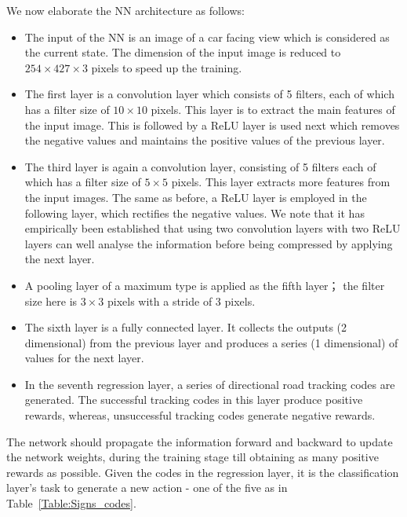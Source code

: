\documentclass{svproc}
\begin{document}
We now elaborate the NN architecture as follows:
\begin{itemize}
\item The input of the NN is an image of a car facing view which is considered as the current state. The dimension of the input image is reduced to $254 \times 427 \times 3$ pixels to speed up the training. 

\item The first layer is a convolution layer which consists of 5 filters, each of which has a filter size of $10 \times 10$ pixels. This layer is to extract the main features of the input image. 
This is followed by a ReLU layer is used next which removes the negative values and maintains the positive values of the previous layer. 

\item The third layer is again a convolution layer, consisting of 5 filters each of which has a filter size of $5 \times 5$ pixels. This layer extracts more features from the input images. The same as before, a ReLU layer is employed in the following layer, which rectifies the negative values. We note that it has empirically been established that using two convolution layers with two ReLU layers can well analyse the information before being compressed by applying the next layer. 

\item A pooling layer of a maximum type is applied as the fifth layer； the filter size here is $3 \times 3$ pixels with a stride of 3 pixels. 

\item The sixth layer is a fully connected layer. It collects the outputs (2 dimensional) from the previous layer and produces a series (1 dimensional) of values for the next layer. 

\item In the seventh regression layer, a series of directional road tracking codes are generated. The successful tracking codes in this layer produce positive rewards, whereas, unsuccessful tracking codes generate negative rewards. 
\end{itemize}

The network should propagate the information forward and backward to update the network weights, during the training stage till obtaining as many positive rewards as possible. Given the codes in the regression layer, it is the classification layer's task to generate a new action - one of the five as in Table~\ref{Table:Signs_codes}. 
\end{document}

